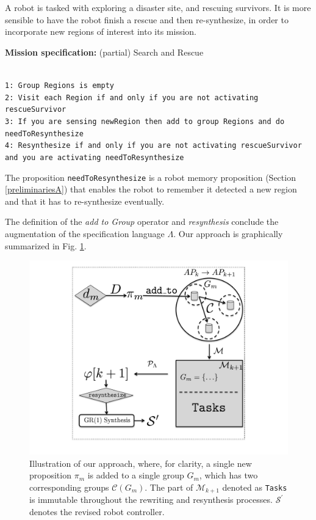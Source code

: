 \begin{myExample}\label{Ex:SnS} A robot is tasked with exploring a disaster site, and rescuing survivors. It is more sensible to have the robot finish a rescue and then re-synthesize, in order to incorporate new regions of interest into its mission.
	\begin{algorithm}
	\textbf{Mission specification:} (partial) Search and Rescue
	
	\vspace{-6 pt}
	\hrulefill\\
	{\small
	\texttt{1: Group Regions is empty}\\
	\texttt{2: Visit each Region if and only if you are not activating rescueSurvivor}\\
	\texttt{3: If you are sensing newRegion then add to group Regions and do needToResynthesize}\\	
	\texttt{4: Resynthesize if and only if you are not activating rescueSurvivor and you are activating needToResynthesize}\\
	}
	\vspace{-10 pt}
	\end{algorithm}
	
The proposition \texttt{needToResynthesize} is a robot memory proposition (Section \ref{preliminariesA}) that enables the robot to remember it detected a new region and that it has to re-synthesize eventually.
\end{myExample}

The definition of the \emph{add to Group} operator and \emph{resynthesis} conclude the augmentation of the specification language $\Lambda$. Our approach is graphically summarized in Fig. \ref{Fig:approach}.

\begin{figure}[h]
	\centering
	\includegraphics[width=0.9\columnwidth, clip]{./img/approach.pdf}
	\caption{Illustration of our approach, where, for clarity, a single new proposition $\pi_{m}$ is added to a single group $G_m$, which has two corresponding groups $\mathcal{C}(G_m)$. The part of $\mathcal{M}_{k+1}$ denoted as \texttt{Tasks} is immutable throughout the rewriting and resynthesis processes. $\mathcal{S}^\prime$ denotes the revised robot controller.} %
	\label{Fig:approach}
\end{figure}
